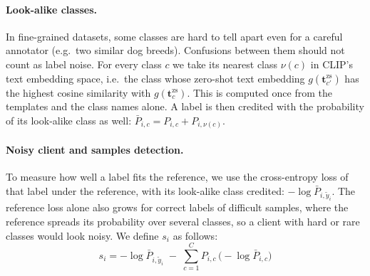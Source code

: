 \documentclass[runningheads]{llncs}
\begin{document}
\paragraph{Look-alike classes.}
In fine-grained datasets, some classes are hard to tell apart even for a careful annotator
(e.g.\ two similar dog breeds). Confusions between them should not count as label noise.
For every class $c$ we take its nearest class $\nu(c)$ in CLIP's text embedding space, i.e.\ the class
whose zero-shot text embedding $g(\mathbf{t}^{\mathrm{zs}}_{c'})$ has the highest cosine
similarity with $g(\mathbf{t}^{\mathrm{zs}}_{c})$. This is computed once from the templates and the class names alone. A label is then credited with the probability of its look-alike class as well:
$\bar{P}_{i,c} = P_{i,c} + P_{i,\nu(c)}$.

\paragraph{Noisy client and samples detection.}
To measure how well a label fits the reference, we use the cross-entropy loss of that label under the
reference, with its look-alike class credited: $-\log \bar{P}_{i,\tilde{y}_i}$. 
The reference loss alone also
grows for correct labels of difficult samples, where the reference spreads its probability over several
classes, so a client with hard or rare classes would look noisy. We define $s_i$ as follows:
\begin{equation}
s_i = -\log \bar{P}_{i,\tilde{y}_i}
      \;-\; \sum_{c=1}^{C} P_{i,c}\,\big(-\log \bar{P}_{i,c}\big)
\label{eq:excess}
\end{equation} %
 
\end{document}
